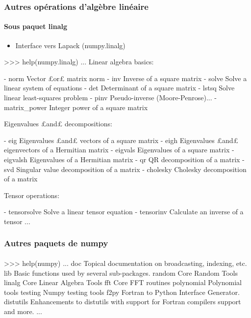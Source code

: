 \begin{frame}[fragile]
\frametitle{Autres opérations d'algèbre linéaire}
\framesubtitle{Sous paquet linalg}
\begin{itemize}
 \item Interface vers Lapack (numpy.linalg)
\end{itemize}
\begin{pythonConsole}
>>> help(numpy.linalg)
...
    Linear algebra basics:
    
    - norm            Vector £or£ matrix norm
    - inv             Inverse of a square matrix
    - solve           Solve a linear system of equations
    - det             Determinant of a square matrix
    - lstsq           Solve linear least-squares problem
    - pinv            Pseudo-inverse (Moore-Penrose)...
    - matrix_power    Integer power of a square matrix
    
    Eigenvalues £and£ decompositions:
    
    - eig             Eigenvalues £and£ vectors of a square matrix
    - eigh            Eigenvalues £and£ eigenvectors of a Hermitian matrix
    - eigvals         Eigenvalues of a square matrix
    - eigvalsh        Eigenvalues of a Hermitian matrix
    - qr              QR decomposition of a matrix
    - svd             Singular value decomposition of a matrix
    - cholesky        Cholesky decomposition of a matrix
    
    Tensor operations:
    
    - tensorsolve     Solve a linear tensor equation
    - tensorinv       Calculate an inverse of a tensor
...
\end{pythonConsole}
\end{frame}
\begin{frame}[fragile]
\frametitle{Autres paquets de numpy}
\framesubtitle{}
\begin{pythonConsole}
>>> help(numpy)
...
    doc
        Topical documentation on broadcasting, indexing, etc.
    lib
        Basic functions used by several sub-packages.
    random
        Core Random Tools
    linalg
        Core Linear Algebra Tools
    fft
        Core FFT routines
    polynomial
        Polynomial tools
    testing
        Numpy testing tools
    f2py
        Fortran to Python Interface Generator.
    distutils
        Enhancements to distutils with support for
        Fortran compilers support and more.
...
\end{pythonConsole}
\end{frame}
